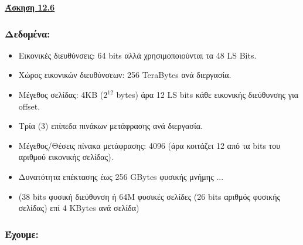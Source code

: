 \documentclass{article}
\begin{document}
 

\newpage

\text{   }
\vspace{-1.25cm}
\begin{center}
    {\underline{\Large \textbf{Άσκηση 12.6}}}
\end{center}
\vspace{0.25cm}


\subsubsection*{\textbf{Δεδομένα:}}
\begin{itemize}
    \item Εικονικές διευθύνσεις: 64 \textlatin{bits} αλλά χρησιμοποιούνται τα 48 \textlatin{LS Bits}.
    \item Χώρος εικονικών διευθύνσεων: 256 \textlatin{TeraBytes} ανά διεργασία.
    \item Μέγεθος σελίδας: 4\textlatin{KB} ($2^{12}$ \textlatin{bytes}) άρα 12 \textlatin{LS bits} κάθε εικονικής διεύθυνσης για \textlatin{offset}.
    \item Τρία (3) επίπεδα πινάκων μετάφρασης ανά διεργασία.
    \item Μέγεθος/Θέσεις πίνακα μετάφρασης: 4096 (άρα κοιτάζει 12 από τα \textlatin{bits} του αριθμού εικονικής σελίδας).
    \item Δυνατότητα επέκτασης έως 256 \textlatin{GBytes} φυσικής μνήμης ...
    \item (38 \textlatin{bits}
    φυσική διεύθυνση ή 64Μ φυσικές σελίδες (26 \textlatin{bits} αριθμός φυσικής
    σελίδας) επί 4 \textlatin{KBytes} ανά σελίδα)
\end{itemize}

\subsubsection*{\textbf{Έχουμε:}}

\end{document}
